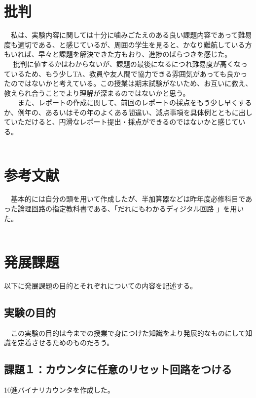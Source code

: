 \documentclass{scrartcl}
\begin{document}
\section{批判}
\label{sec:org9167088}
  　私は、実験内容に関しては十分に噛みごたえのある良い課題内容であって難易度も適切である、と感じているが、周囲の学生を見ると、かなり難航している方もいれば、早々と課題を解決できた方もおり、進捗のばらつきを感じた。\\
　  批判に値するかはわからないが、課題の最後になるにつれ難易度が高くなっているため、もう少しTA、教員や友人間で協力できる雰囲気があっても良かったのではないかと考えている。この授業は期末試験がないため、お互いに教え、教えられ合うことでより理解が深まるのではないかと思う。\\
　　また、レポートの作成に関して、前回のレポートの採点をもう少し早くするか、例年の、あるいはその年のよくある間違い、減点事項を具体例とともに出していただけると、円滑なレポート提出・採点ができるのではないかと感じている。\\
　　\\

\section{参考文献}
\label{sec:org5b5b3b4}
　基本的には自分の頭を用いて作成したが、半加算器などは昨年度必修科目であった論理回路の指定教科書である、「だれにもわかるディジタル回路 \cite{book1}」を用いた。\\


\printbibliography[title=References]\\

\section{発展課題}
\label{sec:org5cf48a0}
以下に発展課題の目的とそれぞれについての内容を記述する。\\

\subsection{実験の目的}
\label{sec:orgc7527da}
　この実験の目的は今までの授業で身につけた知識をより発展的なものにして知識を定着させるためのものだろう。\\
\subsection{課題１：カウンタに任意のリセット回路をつける}
\label{sec:org35adfcf}
10進バイナリカウンタを作成した。\\
\end{document}

